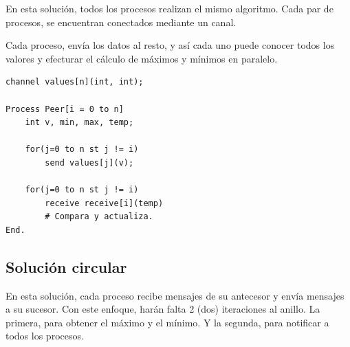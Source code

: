 \documentclass[a4paper, 10pt]{report}
\begin{document}
En esta solución, todos los procesos realizan el mismo algoritmo. Cada par de procesos, se encuentran conectados mediante un canal.

Cada proceso, envía los datos al resto, y así cada uno puede conocer todos los valores y efecturar el cálculo de máximos y mínimos en paralelo.

\begin{multicols}{2}
\begin{lstlisting}
channel values[n](int, int);

Process Peer[i = 0 to n]
    int v, min, max, temp;

    for(j=0 to n st j != i)
        send values[j](v);

    for(j=0 to n st j != i)
        receive receive[i](temp)
        # Compara y actualiza.
End.
\end{lstlisting}

\columnbreak
    
\centering
\vspace*{\fill}
\vspace*{\fill}
\end{multicols}

\subsection{Solución circular}

En esta solución, cada proceso recibe mensajes de su antecesor y envía mensajes a su sucesor. Con este enfoque, harán falta 2 (dos) iteraciones al anillo. La primera, para obtener el máximo y el mínimo. Y la segunda, para notificar a todos los procesos.
\end{document}
